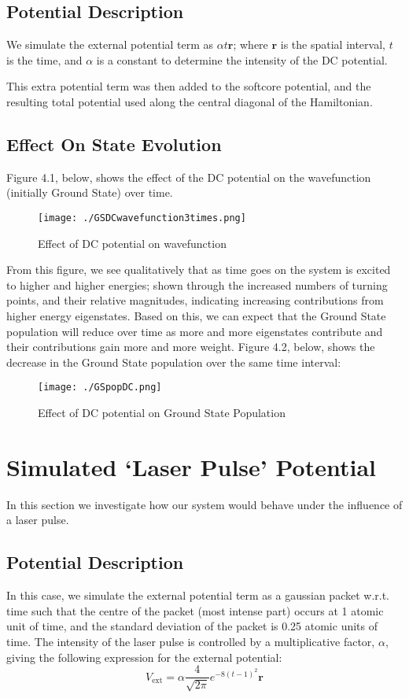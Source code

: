 \subsection{Potential Description}
We simulate the external potential term as $\alpha t \mathbf{r}$; where $\mathbf{r}$ is the spatial interval, $t$ is the time, and $\alpha$ is a constant to determine the intensity of the DC potential.

This extra potential term was then added to the softcore potential, and the resulting total potential used along the central diagonal of the Hamiltonian.

\subsection{Effect On State Evolution}
Figure 4.1, below, shows the effect of the DC potential on the wavefunction (initially Ground State) over time.
\begin{figure}[H]
          \texttt{[image: ./GSDCwavefunction3times.png]}
          \centering
          \caption{Effect of DC potential on wavefunction}
\end{figure}
From this figure, we see qualitatively that as time goes on the system is excited to higher and higher energies; shown through the increased numbers of turning points, and their relative magnitudes, indicating increasing contributions from higher energy eigenstates. Based on this, we can expect that the Ground State population will reduce over time as more and more eigenstates contribute and their contributions gain more and more weight. Figure 4.2, below, shows the decrease in the Ground State population over the same time interval:

\begin{figure}[H]
          \texttt{[image: ./GSpopDC.png]}
          \centering
          \caption{Effect of DC potential on Ground State Population}
\end{figure}

\section{Simulated `Laser Pulse' Potential}
In this section we investigate how our system would behave under the influence of a laser pulse.

\subsection{Potential Description}
In this case, we simulate the external potential term as a gaussian packet w.r.t. time such that the centre of the packet (most intense part) occurs at 1 atomic unit of time, and the standard deviation of the packet is 0.25 atomic units of time. The intensity of the laser pulse is controlled by a multiplicative factor, $\alpha$, giving the following expression for the external potential: 
$$
V_{\text{ext}} = \alpha \frac{4}{\sqrt{2\pi}}e^{-8\left(t-1\right)^{2}}\mathbf{r}
$$

